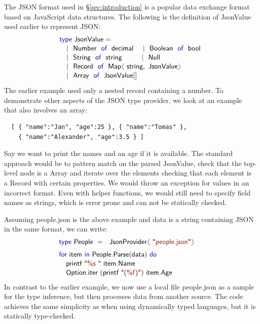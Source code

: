 \documentclass[10pt,preprint,blind,clearpagebib]{sigplanconf}
\newcommand{\langl}{\begin{picture}(4.5,7)
\put(1.1,2.5){\rotatebox{60}{\line(1,0){5.5}}}
\put(1.1,2.5){\rotatebox{300}{\line(1,0){5.5}}}
\end{picture}}
\newcommand{\rangl}{\begin{picture}(4.5,7)
\put(.9,2.5){\rotatebox{120}{\line(1,0){5.5}}}
\put(.9,2.5){\rotatebox{240}{\line(1,0){5.5}}}
\end{picture}}
\newcommand{\kvd}[1]{\textnormal{\textcolor{kvdclr}{\sffamily #1}}}
\newcommand{\str}[1]{\textnormal{\textcolor{strclr}{\sffamily "#1"}}}
\newcommand{\strf}[1]{\textnormal{\textcolor{strclr}{\sffamily #1}}}
\newcommand{\ident}[1]{\textnormal{\sffamily #1}}
\begin{document}
The JSON format used in \S\ref{sec:introduction} is a popular data exchange format based on 
JavaScript data structures. The following is the definition of \ident{JsonValue} 
used earlier to represent JSON:
%
\begin{equation*}
\begin{array}{l}
 \kvd{type}~\ident{JsonValue} = \\[0.1em]
 \quad|~ \ident{Number}~\kvd{of}~\ident{decimal} ~~~~|~ \ident{Boolean}~\kvd{of}~\ident{bool} \\[0.1em]
 \quad|~ \ident{String}~\kvd{of}~\ident{string} ~~\qquad\, |~ \ident{Null} \\[0.1em]
 \quad|~ \ident{Record}~\kvd{of}~\ident{Map}\langl\ident{string}, \ident{JsonValue}\rangl \\[0.1em]
 \quad|~ \ident{Array}~\kvd{of}~\ident{JsonValue}[] \\[0.1em]
\end{array}
\end{equation*}
%
The earlier example used only a nested record containing a number. To demonstrate other 
aspects of the JSON type provider, we look at an example that also involves an array:
%
{\small{
\begin{verbatim}
  [ { "name":"Jan", "age":25 }, { "name":"Tomas" },
    { "name":"Alexander", "age":3.5 } ]
\end{verbatim}
}}
%
\noindent
Say we want to print the names and an age if it is available. The standard approach would 
be to pattern match on the parsed \ident{JsonValue}, check that the top-level node is a \ident{Array}
and iterate over the elements checking that each element is a \ident{Record} with certain properties. 
We would throw an exception for values in an incorrect format. Even with helper functions, 
we would still need to specify field names as strings, which is error prone and can not be 
statically checked.

Assuming \strf{people.json} is the above example and \ident{data} is a string containing
JSON in the same format, we can write:
%
\begin{equation*}
\begin{array}{l}
 \kvd{type}~\ident{People}~=~\ident{JsonProvider}\langl\str{people.json}\rangl\hspace{1em} \\[0.6em]
 \kvd{for}~\ident{item}~\kvd{in}~\ident{People.Parse}(\ident{data})~\kvd{do}\\[0.1em]
 \quad\ident{printf}~\str{\%s }~\ident{item.Name}\\[0.1em]
 \quad\ident{Option.iter}~(\ident{printf}~\str{(\%f)})~\ident{item.Age}
\end{array}
\end{equation*}
%
In contrast to the earlier example, we now use a local file \strf{people.json} as a sample for 
the type inference, but then processes data from another source. The code achieves the same 
simplicity as when using dynamically typed languages, but it is statically type-checked.
\end{document}
